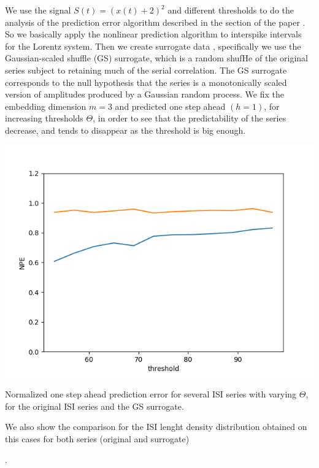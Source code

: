 \documentclass[10pt]{article}
\begin{document}
We use the signal $S(t)=(x(t)+2)^2$ and different thresholds to do the analysis of the prediction error algorithm described in the section of the paper \cite{interspike}. So we basically apply the nonlinear prediction algorithm to interspike intervals for the Lorentz system. Then we create surrogate data \cite{surrogate}, specifically we use the Gaussian-scaled shuffle (GS) surrogate, which is a random shufHe of the original series subject to retaining much of the serial correlation. The GS surrogate corresponds to the null hypothesis that the series is a monotonically scaled version of amplitudes produced by a Gaussian random process. We fix the embedding dimension $m=3$ and predicted one step ahead $(h=1)$, for increasing thresholds $\Theta$, in order to see that the predictability of the series decrease, and tends to disappear as the threshold is big enough.

\begin{center}
\includegraphics[scale=0.5]{NPE_12series}
\caption{Normalized one step ahead prediction error for several ISI series with varying $\Theta$, for the original ISI series and the GS surrogate.}
\label{fig:12series}
\end{center}

We also show the comparison for the ISI lenght density distribution obtained on this cases for both series (original and surrogate)

\begin{center}
\caption{.}
\label{fig:distributions}
\end{center}
\end{document}
